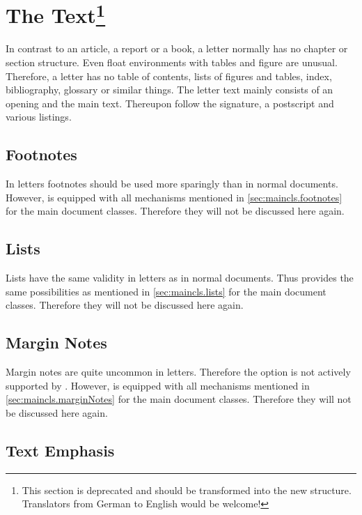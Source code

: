 \section{The Text\protect\footnote{This section is
  deprecated and should be transformed into the new structure. Translators
  from German to English would be welcome!}}
\label{sec:scrlttr2.text}

In contrast to an article, a report or a book, a letter normally has
no chapter or section structure.  Even float environments with tables
and figure are unusual.  Therefore, a letter has no table of contents,
lists of figures and tables, index, bibliography, glossary or similar
things.  The letter text mainly consists of an opening and the main
text. Thereupon follow the signature, a postscript and various
listings.


\subsection{Footnotes}
\label{sec:scrlttr2.footnotes}

In letters footnotes should be used more sparingly than in normal
documents. However,  is equipped with all mechanisms
mentioned in \autoref{sec:maincls.footnotes} for the main document
classes. Therefore they will not be discussed here again.

\subsection{Lists}
\label{sec:scrlttr2.lists}

Lists have the same validity in letters as in normal documents.  Thus
 provides the same possibilities as mentioned in
\autoref{sec:maincls.lists} for the main document classes. Therefore
they will not be discussed here again.

\subsection{Margin Notes}
\label{sec:scrlttr2.marginNotes}

Margin notes are quite uncommon in letters. Therefore the option
 is not actively supported by .
However,  is equipped with all mechanisms mentioned in
\autoref{sec:maincls.marginNotes} for the main document
classes. Therefore they will not be discussed here again.

\subsection{Text Emphasis}
\label{sec:scrlttr2.emphasis}

